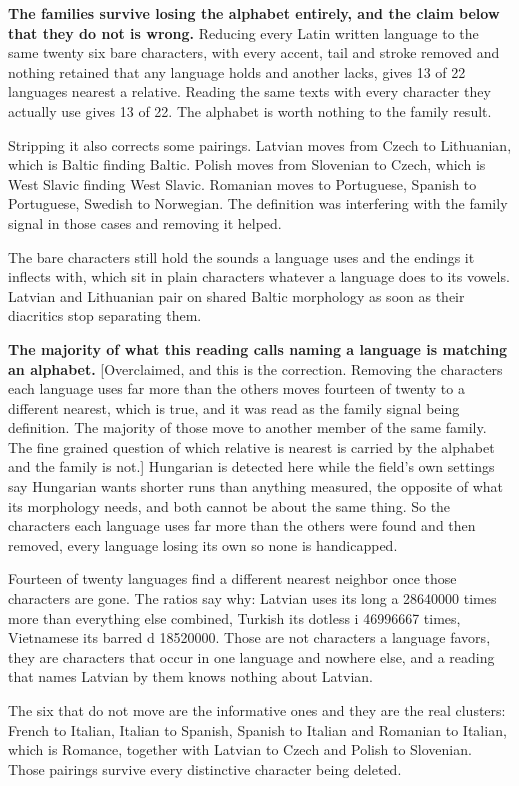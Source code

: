 \textbf{The families survive losing the alphabet entirely, and the claim below that they do not is wrong.} Reducing every Latin written language to the same twenty six bare characters, with every accent, tail and stroke removed and nothing retained that any language holds and another lacks, gives 13 of 22 languages nearest a relative. Reading the same texts with every character they actually use gives 13 of 22. The alphabet is worth nothing to the family result.

Stripping it also corrects some pairings. Latvian moves from Czech to Lithuanian, which is Baltic finding Baltic. Polish moves from Slovenian to Czech, which is West Slavic finding West Slavic. Romanian moves to Portuguese, Spanish to Portuguese, Swedish to Norwegian. The definition was interfering with the family signal in those cases and removing it helped.

The bare characters still hold the sounds a language uses and the endings it inflects with, which sit in plain characters whatever a language does to its vowels. Latvian and Lithuanian pair on shared Baltic morphology as soon as their diacritics stop separating them.

\textbf{The majority of what this reading calls naming a language is matching an alphabet.} [Overclaimed, and this is the correction. Removing the characters each language uses far more than the others moves fourteen of twenty to a different nearest, which is true, and it was read as the family signal being definition. The majority of those move to another member of the same family. The fine grained question of which relative is nearest is carried by the alphabet and the family is not.] Hungarian is detected here while the field's own settings say Hungarian wants shorter runs than anything measured, the opposite of what its morphology needs, and both cannot be about the same thing. So the characters each language uses far more than the others were found and then removed, every language losing its own so none is handicapped.

Fourteen of twenty languages find a different nearest neighbor once those characters are gone. The ratios say why: Latvian uses its long a 28640000 times more than everything else combined, Turkish its dotless i 46996667 times, Vietnamese its barred d 18520000. Those are not characters a language favors, they are characters that occur in one language and nowhere else, and a reading that names Latvian by them knows nothing about Latvian.

The six that do not move are the informative ones and they are the real clusters: French to Italian, Italian to Spanish, Spanish to Italian and Romanian to Italian, which is Romance, together with Latvian to Czech and Polish to Slovenian. Those pairings survive every distinctive character being deleted.

